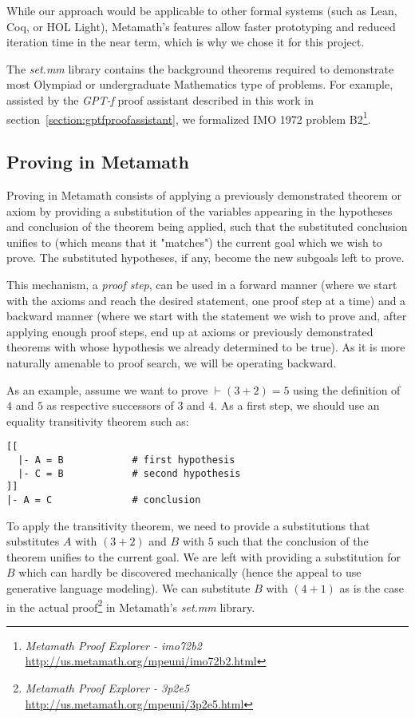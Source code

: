 \documentclass{article}
\begin{document}
While our approach would be applicable to other formal systems (such as Lean, Coq, or HOL Light), Metamath's features allow faster prototyping and reduced iteration time in the near term, which is why we chose it for this project.

The \textit{set.mm} library contains the background theorems required to demonstrate most Olympiad or undergraduate Mathematics type of problems. For example, assisted by the \emph{GPT-f} proof assistant described in this work in section~\ref{section:gptfproofassistant}, we formalized IMO 1972 problem B2\footnote{\textit{Metamath Proof Explorer - imo72b2} \url{http://us.metamath.org/mpeuni/imo72b2.html}}.

\subsection{Proving in Metamath}

Proving in Metamath consists of applying a previously demonstrated theorem or axiom by providing a substitution of the variables appearing in the hypotheses and conclusion of the theorem being applied, such that the substituted conclusion unifies to (which means that it "matches") the current goal which we wish to prove.  The substituted hypotheses, if any, become the new subgoals left to prove.

This mechanism, a \textit{proof step}, can be used in a forward manner (where we start with the axioms and reach the desired statement, one proof step at a time) and a backward manner (where we start with the statement we wish to prove and, after applying enough proof steps, end up at axioms or previously demonstrated theorems with whose hypothesis we already determined to be true). As it is more naturally amenable to proof search, we will be operating backward. 

As an example, assume we want to prove $\vdash ( 3 + 2 ) = 5$ using the definition of $4$ and $5$ as respective successors of $3$ and $4$. As a first step, we should use an equality transitivity theorem such as:

\begin{verbatim}
[[
  |- A = B            # first hypothesis
  |- C = B            # second hypothesis
]]
|- A = C              # conclusion
\end{verbatim}

To apply the transitivity theorem, we need to provide a substitutions that substitutes $A$ with $( 3 + 2)$ and $B$ with $5$ such that the conclusion of the theorem unifies to the current goal. We are left with providing a substitution for $B$ which can hardly be discovered mechanically (hence the appeal to use generative language modeling). We can substitute $B$ with $( 4 + 1 )$ as is the case in the actual proof\footnote{\textit{Metamath Proof Explorer - 3p2e5} \url{http://us.metamath.org/mpeuni/3p2e5.html}} in Metamath's \textit{set.mm} library.
\end{document}
